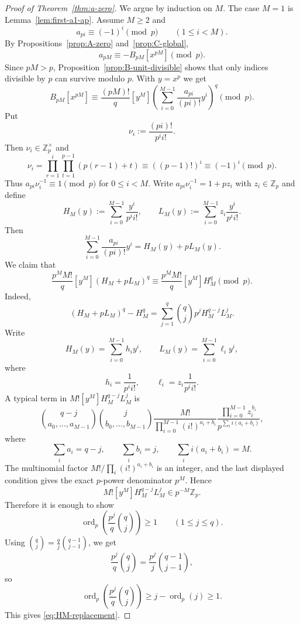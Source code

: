 \documentclass[11pt]{amsart}
\numberwithin{equation}{section}
\DeclareMathOperator{\ordop}{ord}
\newcommand{\Zp}{\mathbb{Z}_p}
\newcommand{\vp}{\ordop_p}
\begin{document}
\begin{proof}[Proof of Theorem~\ref{thm:a-zero}]
We argue by induction on $M$.  The case $M=1$ is Lemma~\ref{lem:first-a1-ap}.  Assume $M\ge2$ and
\[
        a_{pi}\equiv (-1)^i\pmod p\qquad(1\le i<M).
\]
By Propositions~\ref{prop:A-zero} and~\ref{prop:C-global},
\[
        a_{pM}\equiv -B_{pM}[x^{pM}]\pmod p.
\]
Since $pM>p$, Proposition~\ref{prop:B-unit-divisible} shows that only indices divisible by $p$ can survive modulo $p$.  With $y=x^p$ we get
\begin{equation}\label{eq:B-div-special}
        B_{pM}[x^{pM}]
        \equiv \frac{(pM)!}{q}[y^M]
        \left(\sum_{i=0}^{M-1}\frac{a_{pi}}{(pi)!}y^i\right)^q
        \pmod p.
\end{equation}
Put
\[
        \nu_i:=\frac{(pi)!}{p^ii!}.
\]
Then $\nu_i\in\Zp^\times$ and
\begin{equation}\label{eq:nu-i}
        \nu_i=\prod_{r=1}^i\prod_{t=1}^{p-1}(p(r-1)+t)\equiv ((p-1)!)^i\equiv (-1)^i\pmod p.
\end{equation}
Thus $a_{pi}\nu_i^{-1}\equiv1\pmod p$ for $0\le i<M$.  Write $a_{pi}\nu_i^{-1}=1+pz_i$ with $z_i\in\Zp$ and define
\[
        H_M(y):=\sum_{i=0}^{M-1}\frac{y^i}{p^ii!},
        \qquad
        L_M(y):=\sum_{i=0}^{M-1}z_i\frac{y^i}{p^ii!}.
\]
Then
\[
        \sum_{i=0}^{M-1}\frac{a_{pi}}{(pi)!}y^i=H_M(y)+pL_M(y).
\]
We claim that
\begin{equation}\label{eq:HM-replacement}
        \frac{p^MM!}{q}[y^M](H_M+pL_M)^q
        \equiv
        \frac{p^MM!}{q}[y^M]H_M^q\pmod p.
\end{equation}
Indeed,
\[
        (H_M+pL_M)^q-H_M^q
        =\sum_{j=1}^q\binom qj p^jH_M^{q-j}L_M^j.
\]
Write
\[
        H_M(y)=\sum_{i=0}^{M-1}h_i y^i,
        \qquad
        L_M(y)=\sum_{i=0}^{M-1}\ell_i y^i,
\]
where
\[
        h_i=\frac1{p^ii!},
        \qquad
        \ell_i=z_i\frac1{p^ii!}.
\]
A typical term in $M![y^M]H_M^{q-j}L_M^j$ is
\[
        \binom{q-j}{a_0,\ldots,a_{M-1}}
        \binom{j}{b_0,\ldots,b_{M-1}}
        \frac{M!}{\prod_{i=0}^{M-1}(i!)^{a_i+b_i}}
        \frac{\prod_{i=0}^{M-1}z_i^{\,b_i}}{p^{\sum_i i(a_i+b_i)}},
\]
where
\[
        \sum_i a_i=q-j,
        \qquad
        \sum_i b_i=j,
        \qquad
        \sum_i i(a_i+b_i)=M.
\]
The multinomial factor $M!/\prod_i (i!)^{a_i+b_i}$ is an integer, and the last displayed condition gives the exact $p$-power denominator $p^M$.  Hence
\[
        M![y^M]H_M^{q-j}L_M^j\in p^{-M}\Zp.
\]
Therefore it is enough to show
\[
        \vp\left(\frac{p^j}{q}\binom qj\right)\ge1\qquad(1\le j\le q).
\]
Using $\binom qj=\frac qj\binom{q-1}{j-1}$, we get
\[
        \frac{p^j}{q}\binom qj=\frac{p^j}{j}\binom{q-1}{j-1},
\]
so
\[
        \vp\left(\frac{p^j}{q}\binom qj\right)\ge j-\vp(j)\ge1.
\]
This gives \eqref{eq:HM-replacement}.


\end{proof}
\end{document}

